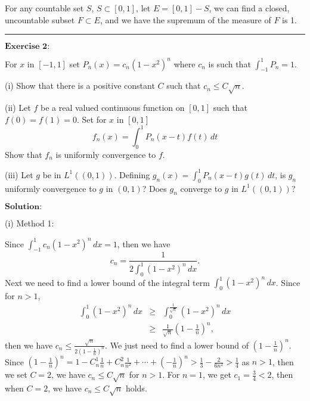\documentclass[12pt]{article}
\begin{document}
For any countable set $S$, $S \subset [0, 1]$, let $E = [0, 1] - S$, we can find a closed, uncountable subset $F \subset E$, and we have the supremum of the measure of $F$ is 1.

\noindent\rule[0.25\baselineskip]{\textwidth}{0.5pt}

\vspace{8pt}
$\textbf{Exercise 2:}$

For $x$ in $[-1, 1]$ set $P_{n} (x) = c_{n} (1 - x^{2})^{n}$ where $c_{n}$ is such that $\int_{-1}^{1} P_{n} = 1.$

(i) Show that there is a positive constant $C$ such that $c_{n} \leq C \sqrt{n}$.

(ii) Let $f$ be a real valued continuous function on $[0, 1]$ such that $f(0) = f(1) = 0$. Set for $x$ in $[0, 1]$
\begin{equation*}
    f_{n}(x) = \int_{0}^{1} P_{n}(x-t) f(t) \, d t
\end{equation*}
Show that $f_{n}$ is uniformly convergence to $f$.

(iii) Let $g$ be in $L^{1}((0, 1))$. Defining $g_{n}(x) = \int_{0}^{1} P_{n} (x- t) g(t) \, d t$, is $g_{n}$ uniformly convergence to $g$ in $(0, 1)$? Does $g_{n}$ converge to $g$ in $L^{1}((0, 1))$?

\vspace{8pt}
$\textbf{Solution:}$

(i) Method 1:

Since $\int_{-1}^{1} c_{n} (1-x^{2})^{n}\, d x = 1$, then we have
\begin{equation*}
   c_{n} = \frac{1}{2 \int_{0}^{1}(1-x^{2})^{n} \, d x }.
\end{equation*}
Next we need to find a lower bound of the integral term $\int_{0}^{1}(1-x^{2})^{n} \, d x$. Since for $n > 1$,
\begin{eqnarray*}
\int_{0}^{1}(1-x^{2})^{n} \, d x &\geq& \int_{0}^{\frac{1}{\sqrt{n}}}(1-x^{2})^{n} \, d x  \\
            &\geq& \frac{1}{\sqrt{n}} (1 - \frac{1}{n})^{n},
\end{eqnarray*}
then we have $c_{n} \leq \frac{\sqrt{n}}{2 (1-\frac{1}{n})^{n}}$. We just need to find a lower bound of $(1 - \frac{1}{n})^{n}$. Since $(1 - \frac{1}{n})^{n} = 1 - C_{n}^{1} \frac{1}{n} + C_{n}^{2} \frac{1}{n^{2}} + \cdots + (-\frac{1}{n})^{n} > \frac{1}{3} - \frac{2}{6n^{2}}  > \frac{1}{4}$ as $n > 1$, then we set $C = 2$, we have $c_{n} \leq C \sqrt{n}$ for $n>1$. For $n = 1$, we get $c_{1} = \frac{3}{4} < 2$, then when $C = 2$, we have $c_{n} \leq C \sqrt{n}$ holds.
\end{document}

